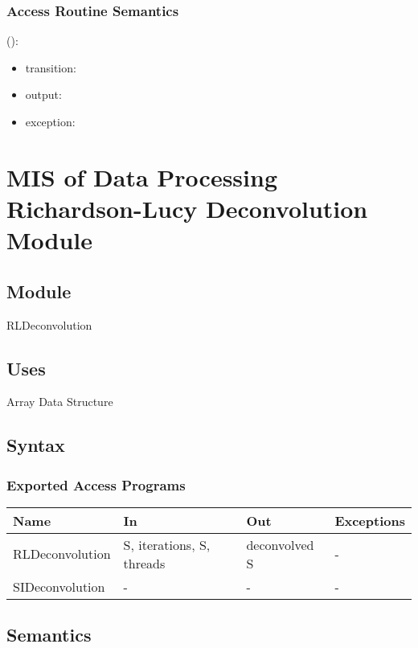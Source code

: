 \documentclass[12pt, titlepage]{article}
\begin{document}
\subsubsection{Access Routine Semantics}

\noindent {}():
\begin{itemize}
\item transition:  
\item output:  
\item exception:  
\end{itemize}

\section{MIS of Data Processing Richardson-Lucy Deconvolution Module} \label{Mod: RLDeconvolution}

\subsection{Module}

RLDeconvolution

\subsection{Uses}
Array Data Structure

\subsection{Syntax}

\subsubsection{Exported Access Programs}

\begin{center}
\begin{tabular}{p{4cm} p{4cm} p{4cm} p{2cm}}
\hline
\textbf{Name} & \textbf{In} & \textbf{Out} & \textbf{Exceptions} \\
\hline
RLDeconvolution & S, iterations, S, threads & deconvolved S & - \\
SIDeconvolution & - & - & - \\
\hline
\end{tabular}
\end{center}

\subsection{Semantics}
\end{document}
